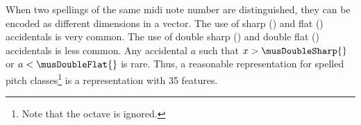 
When two spellings of the same \gls{midi} note number are
distinguished, they can be encoded as different dimensions
in a vector. The use of sharp (\musSharp{}) and flat
(\musFlat{}) accidentals is very common. The use of double
sharp (\musDoubleSharp{}) and double flat (\musDoubleFlat{})
accidentals is less common. Any accidental $a$ such that $x
> \musDoubleSharp{}$ or $a < \musDoubleFlat{}$ is rare.
Thus, a reasonable representation for spelled pitch
classes\footnote{Note that the octave is ignored.} is a
representation with 35 features.
